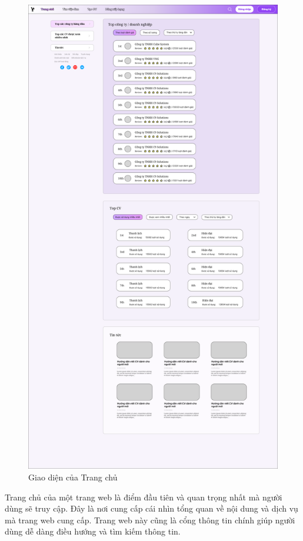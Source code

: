 \begin{figure}[H]
\begin{center}
    \includegraphics[scale=0.15]{img/Homepage.png}
    \caption{Giao diện của Trang chủ}
\end{center}
\end{figure}

Trang chủ của một trang web là điểm đầu tiên và quan trọng nhất mà người dùng sẽ truy cập. Đây là nơi cung cấp cái nhìn tổng quan về nội dung và dịch vụ mà trang web cung cấp. Trang web này cũng là cổng thông tin chính giúp người dùng dễ dàng điều hướng và tìm kiếm thông tin.


